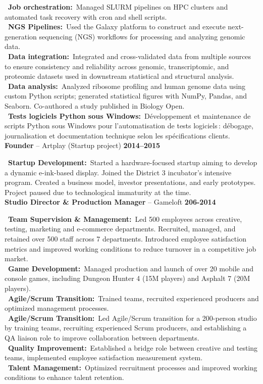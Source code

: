 \documentclass[a4paper,10pt]{article}
\newcommand{\resumeItem}[3]{%
  \noindent\textbf{#1} -- #2 \hfill \textbf{#3} \\
  \vspace{0.3em}
}
\newcommand{\jobItem}[2]{%
  \noindent
  \textbullet\ \textbf{#1\ifthenelse{\boolean{EN}}{}{ }:}~#2\vspace{0.3em} \\
}
\begin{document}
{{    \jobItem{Job orchestration}{Managed SLURM pipelines on HPC clusters and automated task recovery with cron and shell scripts.}
    \jobItem{NGS Pipelines}{Used the Galaxy platform to construct and execute next-generation sequencing (NGS) workflows for processing and analyzing genomic data.}
    \jobItem{Data integration}{Integrated and cross-validated data from multiple sources to ensure consistency and reliability across genomic, transcriptomic, and proteomic datasets used in downstream statistical and structural analysis.}
    \jobItem{Data analysis}{Analyzed ribosome profiling and human genome data using custom Python scripts; generated statistical figures with NumPy, Pandas, and Seaborn. Co-authored a study published in Biology Open.}
    \jobItem{Tests logiciels Python sous Windows}{Développement et maintenance de scripts Python sous Windows pour l’automatisation de tests logiciels : débogage, journalisation et documentation technique selon les spécifications clients.}
    \vspace{1em}
    \resumeItem{Founder}{Artplay (Startup project)}{2014–2015}
    \jobItem{Startup Development}{Started a hardware-focused startup aiming to develop a dynamic e-ink-based display. Joined the District 3 incubator’s intensive program. Created a business model, investor presentations, and early prototypes. Project paused due to technological immaturity at the time.}
    \vspace{1em}
    \resumeItem{Studio Director \& Production Manager}{Gameloft}{206-2014}
    \jobItem{Team Supervision \& Management}{Led 500 employees across creative, testing, marketing and e-commerce departments. Recruited, managed, and retained over 500 staff across 7 departments. Introduced employee satisfaction metrics and improved working conditions to reduce turnover in a competitive job market.}
    \jobItem{Game Development}{Managed production and launch of over 20 mobile and console games, including Dungeon Hunter 4 (15M players) and Asphalt 7 (20M players).}
    \jobItem{Agile/Scrum Transition}{Trained teams, recruited experienced producers and optimized management processes.}
    \jobItem{Agile/Scrum Transition}{Led Agile/Scrum transition for a 200-person studio by training teams, recruiting experienced Scrum producers, and establishing a QA liaison role to improve collaboration between departments.}
    \jobItem{Quality Improvement}{Established a bridge role between creative and testing teams, implemented employee satisfaction measurement system.}
    \jobItem{Talent Management}{Optimized recruitment processes and improved working conditions to enhance talent retention.}
}}
\end{document}
